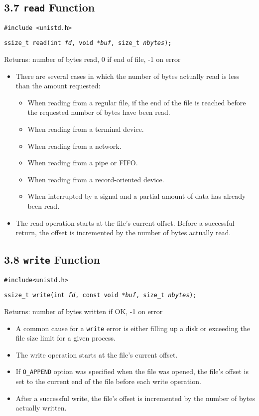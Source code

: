\documentclass[]{article} \usepackage[all]{xy}
\newcommand{\code}{\texttt}
\begin{document}
\subsection*{3.7 \code{read} Function}
\code{\#include <unistd.h>}

\code{ssize\_t read(int \emph{fd}, void *\emph{buf}, size\_t \emph{nbytes});}

Returns: number of bytes read, 0 if end of file, -1 on error

\begin{itemize}
\item There are several cases in which the number of bytes actually read is less
than the amount requested:
\begin{itemize}
\item When reading from a regular file, if the end of the file is reached before
the requested number of bytes have been read.
\item When reading from a terminal device.
\item When reading from a network.
\item When reading from a pipe or FIFO.
\item When reading from a record-oriented device.
\item When interrupted by a signal and a partial amount of data has already been
read.
\end{itemize}
\item The read operation starts at the file's current offset. Before a
successful return, the offset is incremented by the number of bytes actually
read.
\end{itemize}

\subsection*{3.8 \code{write} Function}
\code{\#include<unistd.h>}

\code{ssize\_t write(int \emph{fd}, const void *\emph{buf}, size\_t
\emph{nbytes});}

Returns: number of bytes written if OK, -1 on error

\begin{itemize}
\item A common cause for a \code{write} error is either filling up a disk or
exceeding the file size limit for a given process.
\item The write operation starts at the file's current offset.
\item If \code{O\_APPEND} option was specified when the file was opened, the
file's offset is set to the current end of the file before each write operation.
\item After a successful write, the file's offset is incremented by the number
of bytes actually written.
\end{itemize}
\end{document}
